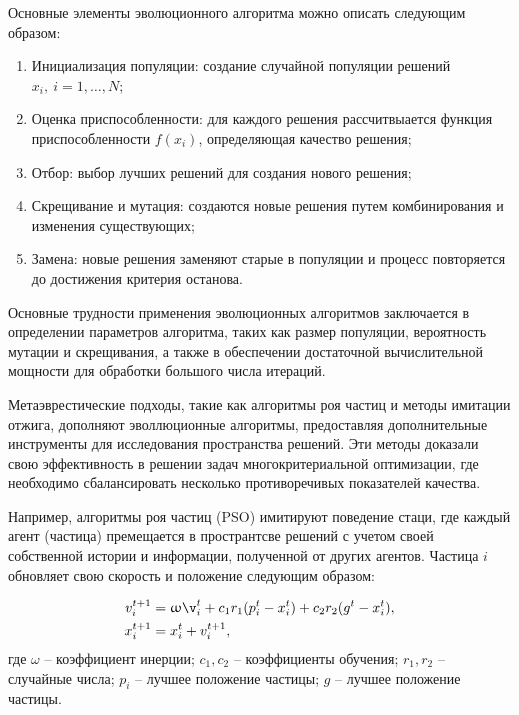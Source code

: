 Основные элементы эволюционного алгоритма можно описать следующим образом:

\begin{enumerate}
    \item Инициализация популяции: создание случайной популяции решений $x_i,~i = 1, \ldots, N$;
    \item Оценка приспособленности: для каждого решения рассчитвыается функция приспособленности $f(x_i)$,
          определяющая качество решения;
    \item Отбор: выбор лучших решений для создания нового решения;
    \item Скрещивание и мутация: создаются новые решения путем комбинирования и изменения существующих;
    \item Замена: новые решения заменяют старые в популяции и процесс повторяется до достижения критерия останова.
\end{enumerate}

Основные трудности применения эволюционных алгоритмов заключается
в определении параметров алгоритма, таких как размер популяции, вероятность мутации и
скрещивания, а также в обеспечении достаточной вычислительной мощности для
обработки большого числа итераций.

Метаэврестические подходы, такие как алгоритмы роя частиц и методы имитации отжига,
дополняют эволлюционные алгоритмы, предоставляя дополнительные инструменты для
исследования пространства решений. Эти методы доказали свою эффективность в
решении задач многокритериальной оптимизации, где необходимо сбалансировать
несколько противоречивых показателей качества.

Например, алгоритмы роя частиц (PSO) имитируют поведение стаци, где каждый
агент (частица) премещается в пространтсве решений с учетом своей собственной
истории и информации, полученной от других агентов. Частица $i$ обновляет
свою скорость и положение следующим образом:

\begin{equation*}
    \begin{aligned}
        v_i^{t+1} & = \omega \v_i^t + c_1 r_1 (p_i^t - x_i^t) + c_2 r_2 (g^t - x_i^t), \\
        x_i^{t+1} & = x_i^t + v_i^{t+1},
    \end{aligned}
\end{equation*}
где $\omega$ -- коэффициент инерции;
$c_1, c_2$ -- коэффициенты обучения;
$r_1, r_2$ -- случайные числа;
$p_i$ -- лучшее положение частицы;
$g$ -- лучшее положение частицы.

